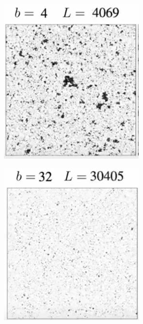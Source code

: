 \documentclass[]{article}
\begin{document}
\begin{figure}[H]
\begin{subfigure}[t]{0.3\textwidth}
		\includegraphics[width=\textwidth]{DouglasAshton1-2}
	\end{subfigure}
	\begin{subfigure}[t]{0.3\textwidth}
		\includegraphics[width=\textwidth]{DouglasAshton1-3}
	\end{subfigure}
\end{figure}
\end{document}

